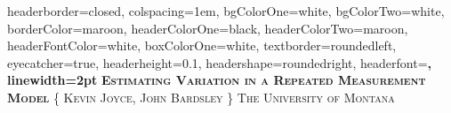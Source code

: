 \documentclass[landscape,a0paper,fontscale=0.285]{baposter} %
\begin{document}
\begin{poster}
{
headerborder=closed, %
colspacing=1em, %
bgColorOne=white, %
bgColorTwo=white, %
borderColor=maroon, %
headerColorOne=black, %
headerColorTwo=maroon, %
headerFontColor=white, %
boxColorOne=white, %
textborder=roundedleft, %
eyecatcher=true, %
headerheight=0.1\textheight, %
headershape=roundedright, %
headerfont=\Large\bf\textsc, %
linewidth=2pt %
}
%
{} %
{\bf\textsc{Estimating Variation in a Repeated Measurement Model}}%
{\textsc{\{ Kevin Joyce, John Bardsley \} \hspace{12pt} The University of Montana}} %
{} %


\end{poster}
\end{document}
